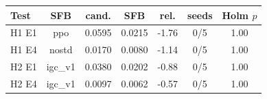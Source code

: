\begin{tabular}{lcccccc}
\toprule
Test & SFB & cand. & SFB & rel. & seeds & Holm $p$\\
\midrule
H1 E1 & ppo & 0.0595 & 0.0215 & -1.76 & 0/5 & 1.00 \\
H1 E4 & nostd & 0.0170 & 0.0080 & -1.14 & 0/5 & 1.00 \\
H2 E1 & igc\_v1 & 0.0380 & 0.0202 & -0.88 & 0/5 & 1.00 \\
H2 E4 & igc\_v1 & 0.0097 & 0.0062 & -0.57 & 0/5 & 1.00 \\
\bottomrule
\end{tabular}
